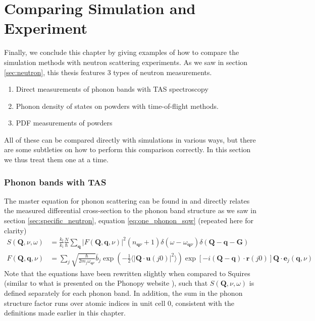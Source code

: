 \section{Comparing Simulation and Experiment}\label{sec:sim_experiment_compare}
Finally, we conclude this chapter by giving examples of how to compare the simulation methods with neutron scattering experiments. As we saw in section \ref{sec:neutron}, this thesis features 3 types of neutron measurements.

\begin{enumerate}
	\item Direct measurements of phonon bands with TAS spectroscopy
	\item Phonon density of states on powders with time-of-flight methods.
	\item PDF measurements of powders
\end{enumerate}

\noindent All of these can be compared directly with simulations in various ways, but there are some subtleties on how to perform this comparison correctly. In this section we thus treat them one at a time.

\subsubsection{Phonon bands with TAS}
The master equation for phonon scattering can be found in \cite{Squires2012} and directly relates the measured differential cross-section to the phonon band structure as we saw in section \ref{sec:specific_neutron}, equation \eqref{eq:one_phonon_sqw} (repeated here for clarity)
%
\begin{align*}
	S(\bm{Q},\nu,\omega) &= \frac{k_\text{f}}{k_\text{i}} \frac{N}{\hbar} \sum_{\bm{q}} | F(\bm{Q},\bm{q},\nu) |^2 ( n_{\bm{q}\nu} + 1) \delta (\omega - \omega_{\bm{q}\nu}) \delta(\bm{Q} - \bm{q} - \bm{G}) \\
	F(\bm{Q}, \bm{q}, \nu) &= \sum_j \sqrt{\frac{\hbar}{2 m_j \omega_{\bm{q}\nu}}} \bar{b}_j \exp \left( -\frac{1}{2} \langle | \bm{Q} \cdot \bm{u}(j0) |^2 \rangle \right) \exp [ -i(\bm{Q} - \bm{q}) \cdot \bm{r}(j0) ] \bm{Q} \cdot \bm{e}_j(\bm{q},\nu)
	\label{eq:one_phonon_sqw}
\end{align*}
%
Note that the equations have been rewritten slightly when compared to Squires \cite{Squires2012} (similar to what is presented on the Phonopy website \cite{phonopywebsite}), such that $S(\bm{Q},\nu,\omega)$ is defined separately for each phonon band. In addition, the sum in the phonon structure factor runs over atomic indices in unit cell 0, consistent with the definitions made earlier in this chapter.

